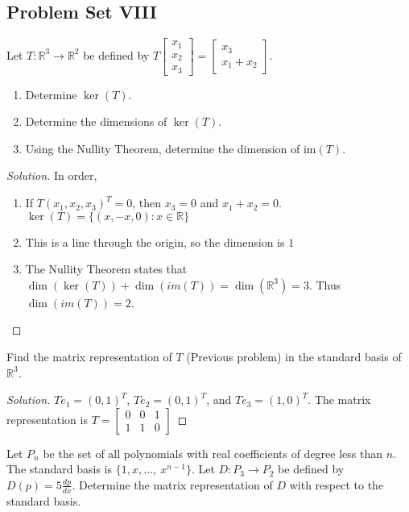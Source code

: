 \documentclass[crop=false,class=book,oneside]{standalone}
\begin{document}
\subsection{Problem Set VIII}
\begin{problem}
Let $T:\mathbb{R}^3\rightarrow \mathbb{R}^2$ be defined by $T\begin{bmatrix} x_1 \\ x_2 \\ x_3 \end{bmatrix} = \begin{bmatrix} x_3 \\ x_1+x_2 \end{bmatrix}$.
\begin{enumerate}
    \item Determine $\ker(T)$.
    \item Determine the dimensions of $\ker(T)$.
    \item Using the Nullity Theorem, determine the dimension of im$(T)$.
\end{enumerate}
\end{problem}
\begin{proof}[Solution]
In order,
\begin{enumerate}
    \item If $T(x_{1},x_{2},x_{3})^{T} = 0$, then $x_3=0$ and $x_{1}+x_{2}=0$. $\ker(T)=\{(x,-x,0):x\in \mathbb{R}\}$
    \item This is a line through the origin, so the dimension is $1$ 
    \item The Nullity Theorem states that $\dim(\ker(T))+\dim(im(T)) = \dim(\mathbb{R}^3) = 3$. Thus $\dim(im(T)) = 2$.
\end{enumerate}
\end{proof}
\begin{problem}
Find the matrix representation of $T$ (Previous problem) in the standard basis of $\mathbb{R}^3$.
\end{problem}
\begin{proof}[Solution]
$Te_1 = (0,1)^T$, $T e_2 = (0,1)^T$, and $Te_3 = (1,0)^T$. The matrix representation is $T=\begin{bmatrix} 0 & 0 & 1 \\ 1 & 1 & 0 \end{bmatrix}$
\end{proof}
\begin{problem}
Let $P_n$ be the set of all polynomials with real coefficients of degree less than $n$. The standard basis is $\{1,x,\hdots, \ x^{n-1}\}$. Let $D:P_3 \rightarrow P_2$ be defined by $D(p) = 5\frac{dp}{dx}$. Determine the matrix representation of $D$ with respect to the standard basis.
\end{problem}
\end{document}
